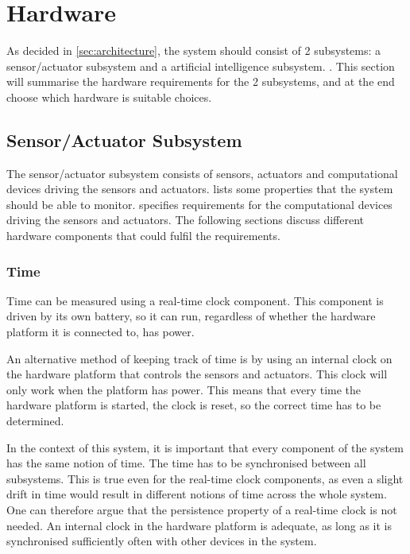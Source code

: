 \section{Hardware}
As decided in \cref{sec:architecture}, the system should consist of 2 subsystems: a sensor/actuator subsystem and a artificial intelligence subsystem. . This section will summarise the hardware requirements for the 2 subsystems, and at the end choose which hardware is suitable choices.

\subsection{Sensor/Actuator Subsystem}
The sensor/actuator subsystem consists of sensors, actuators and computational devices driving the sensors and actuators.  lists some properties that the system should be able to monitor.  specifies requirements for the computational devices driving the sensors and actuators. The following sections discuss different hardware components that could fulfil the requirements. 

\subsubsection{Time}
Time can be measured using a real-time clock component. This component is driven by its own battery, so it can run, regardless of whether the hardware platform it is connected to, has power.

An alternative method of keeping track of time is by using an internal clock on the hardware platform that controls the sensors and actuators. This clock will only work when the platform has power. This means that every time the hardware platform is started, the clock is reset, so the correct time has to be determined.

In the context of this system, it is important that every component of the system has the same notion of time. The time has to be synchronised between all subsystems. This is true even for the real-time clock components, as even a slight drift in time would result in different notions of time across the whole system. One can therefore argue that the persistence property of a real-time clock is not needed. An internal clock in the hardware platform is adequate, as long as it is synchronised sufficiently often with other devices in the system.

